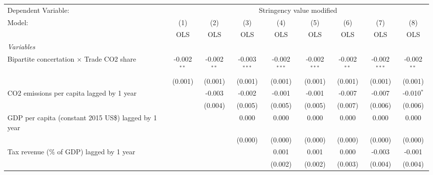 
\begingroup
\centering
\begin{tabular}{lcccccccc}
   \toprule
   Dependent Variable: & \multicolumn{8}{c}{Stringency value modified}\\
   Model:                                                    & (1)           & (2)           & (3)            & (4)            & (5)            & (6)           & (7)            & (8)\\  
                                                             &  OLS          & OLS           & OLS            & OLS            & OLS            & OLS           & OLS            & OLS\\  
   \midrule
   \emph{Variables}\\
   Bipartite concertation $\times$ Trade CO2 share           & -0.002$^{**}$ & -0.002$^{**}$ & -0.003$^{***}$ & -0.002$^{***}$ & -0.002$^{***}$ & -0.002$^{**}$ & -0.002$^{***}$ & -0.002$^{**}$\\   
                                                             & (0.001)       & (0.001)       & (0.001)        & (0.001)        & (0.001)        & (0.001)       & (0.001)        & (0.001)\\   
   CO2 emissions per capita lagged by 1 year                 &               & -0.003        & -0.002         & -0.001         & -0.001         & -0.007        & -0.007         & -0.010$^{*}$\\   
                                                             &               & (0.004)       & (0.005)        & (0.005)        & (0.005)        & (0.007)       & (0.006)        & (0.006)\\   
   GDP per capita (constant 2015 US\$) lagged by 1 year      &               &               & 0.000          & 0.000          & 0.000          & 0.000         & 0.000          & 0.000\\   
                                                             &               &               & (0.000)        & (0.000)        & (0.000)        & (0.000)       & (0.000)        & (0.000)\\   
   Tax revenue (\% of GDP) lagged by 1 year                  &               &               &                & 0.001          & 0.001          & 0.000         & -0.003         & -0.001\\   
                                                             &               &               &                & (0.002)        & (0.002)        & (0.003)       & (0.004)        & (0.004)\\   

\end{tabular}
